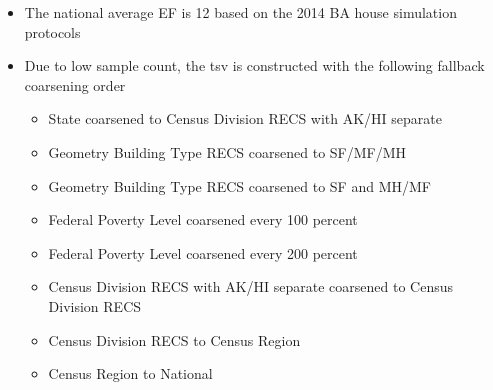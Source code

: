 \begin{itemize}
\item The national average EF is 12 based on the 2014 BA house simulation protocols
\item Due to low sample count, the tsv is constructed with the following fallback coarsening order
  \begin{itemize}
  \item [1] State coarsened to Census Division RECS with AK/HI separate
  \item [2] Geometry Building Type RECS coarsened to SF/MF/MH
  \item [3] Geometry Building Type RECS coarsened to SF and MH/MF
  \item [4] Federal Poverty Level coarsened every 100 percent
  \item [5] Federal Poverty Level coarsened every 200 percent
  \item [6] Census Division RECS with AK/HI separate coarsened to Census Division RECS
  \item [7] Census Division RECS to Census Region
  \item [8] Census Region to National
  \end{itemize}
\end{itemize}
